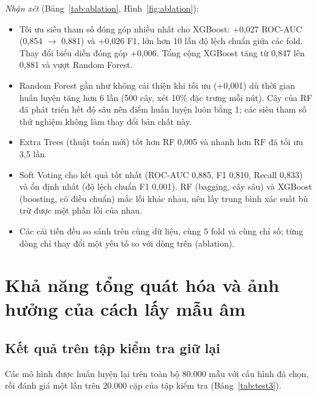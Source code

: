 \documentclass[12pt,a4paper,oneside]{report}
\begin{document}
\textit{Nhận xét} (Bảng~\ref{tab:ablation}, Hình~\ref{fig:ablation}):
\begin{itemize}
  \item Tối ưu siêu tham số đóng góp nhiều nhất cho XGBoost: +0,027 ROC-AUC
        (0,854 $\rightarrow$ 0,881) và +0,026 F1, lớn hơn 10 lần độ lệch chuẩn
        giữa các fold. Thay đổi biểu diễn đóng góp +0,006. Tổng cộng XGBoost tăng từ
        0,847 lên 0,881 và vượt Random Forest.
  \item Random Forest gần như không cải thiện khi tối ưu (+0,001) dù thời
        gian huấn luyện tăng hơn 6 lần (500 cây, xét 10\% đặc trưng mỗi nút). Cây của
        RF đã phát triển hết độ sâu nên điểm huấn luyện luôn bằng 1; các siêu tham số
        thử nghiệm không làm thay đổi bản chất này.
  \item Extra Trees (thuật toán mới) tốt hơn RF 0,005 và nhanh hơn RF đã
        tối ưu 3,5 lần.
  \item Soft Voting cho kết quả tốt nhất (ROC-AUC 0,885, F1 0,810, Recall
        0,833) và ổn định nhất (độ lệch chuẩn F1 0,001). RF (bagging, cây sâu) và
        XGBoost (boosting, có điều chuẩn) mắc lỗi khác nhau, nên lấy trung bình xác
        suất bù trừ được một phần lỗi của nhau.
  \item Các cải tiến đều so sánh trên cùng dữ liệu, cùng 5 fold và cùng chỉ số; từng
        dòng chỉ thay đổi một yếu tố so với dòng trên (ablation).
\end{itemize}

\section{Khả năng tổng quát hóa và ảnh hưởng của cách lấy mẫu âm}
\label{sec:tongquat}

\subsection{Kết quả trên tập kiểm tra giữ lại}
Các mô hình được huấn luyện lại trên toàn bộ 80.000 mẫu với cấu hình đã chọn, rồi
đánh giá một lần trên 20.000 cặp của tập kiểm tra (Bảng~\ref{tab:test3}).
\end{document}
